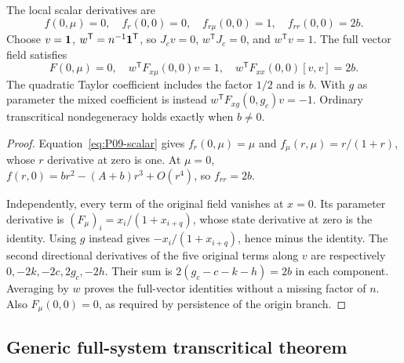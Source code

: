 \begin{proposition}
\label{prop:P09-coefficients}
The local scalar derivatives are
\begin{equation}
 f(0,\mu)=0,\quad f_r(0,0)=0,\quad
 f_{r\mu}(0,0)=1,\quad f_{rr}(0,0)=2b.
 \label{eq:P09-scalar-coefficients}
\end{equation}
Choose $v=\mathbf{1}$, $w^{\mathsf T}=n^{-1}\mathbf{1}^{\mathsf T}$, so
$J_cv=0$, $w^{\mathsf T}J_c=0$, and $w^{\mathsf T}v=1$.
The full vector field satisfies
\begin{equation}
 F(0,\mu)=0,\quad w^{\mathsf T}F_{x\mu}(0,0)v=1,\quad
 w^{\mathsf T}F_{xx}(0,0)[v,v]=2b.
 \label{eq:P09-full-coefficients}
\end{equation}
The quadratic Taylor coefficient includes the factor $1/2$ and is $b$.
With $g$ as parameter the mixed coefficient is instead
$w^{\mathsf T}F_{xg}(0,g_c)v=-1$. Ordinary transcritical
nondegeneracy holds exactly when $b\ne0$.
\end{proposition}
\begin{proof}
Equation~\eqref{eq:P09-scalar} gives $f_r(0,\mu)=\mu$ and
$f_\mu(r,\mu)=r/(1+r)$, whose $r$ derivative at zero is one.
At $\mu=0$, $f(r,0)=br^2-(A+b)r^3+O(r^4)$, so $f_{rr}=2b$.

Independently, every term of the original field vanishes at $x=0$.
Its parameter derivative is $(F_\mu)_i=x_i/(1+x_{i+q})$,
whose state derivative at zero is the identity. Using $g$ instead
gives $-x_i/(1+x_{i+q})$, hence minus the identity.
The second directional derivatives of the five original terms along $v$
are respectively $0,-2k,-2c,2g_c,-2h$. Their sum is
$2(g_c-c-k-h)=2b$ in each component. Averaging by $w$ proves the
full-vector identities without a missing factor of $n$. Also
$F_\mu(0,0)=0$, as required by persistence of the origin branch.
\end{proof}

\subsection{Generic full-system transcritical theorem}
\label{slot:P09-2}

